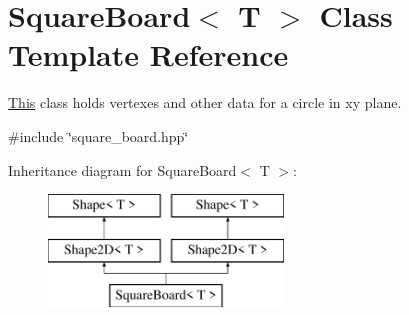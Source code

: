 \hypertarget{classSquareBoard}{}\section{Square\+Board$<$ T $>$ Class Template Reference}
\label{classSquareBoard}


\mbox{\hyperlink{classThis}{This}} class holds vertexes and other data for a circle in xy plane.  




{\ttfamily \#include \char`\"{}square\+\_\+board.\+hpp\char`\"{}}

Inheritance diagram for Square\+Board$<$ T $>$\+:\begin{figure}[H]
\begin{center}
\leavevmode
\includegraphics[height=3.000000cm]{classSquareBoard}
\end{center}
\end{figure}
